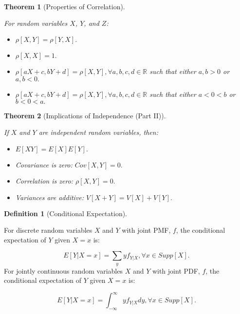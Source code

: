\documentclass[
]{article}
\providecommand{\tightlist}{%
  \setlength{\itemsep}{0pt}\setlength{\parskip}{0pt}}
\newtheorem{theorem}{Theorem}[section]
\theoremstyle{definition}
\newtheorem{definition}{Definition}[section]
\theoremstyle{definition}
\theoremstyle{definition}
\theoremstyle{remark}
\begin{document}
\begin{theorem}[Properties of Correlation]
\protect\hypertarget{thm:unlabeled-div-86}{}\label{thm:unlabeled-div-86}

For random variables \(X\), \(Y\), and \(Z\):

\begin{itemize}
\tightlist
\item
  \(\rho[X,Y] = \rho[Y,X].\)
\item
  \(\rho[X,X] = 1.\)
\item
  \(\rho[aX + c, bY + d] = \rho[X,Y], \forall a,b,c,d \in \mathbb{R}\) such that either \(a,b > 0\) or \(a,b < 0.\)
\item
  \(\rho[aX + c, bY + d] = \rho[X,Y], \forall a,b,c,d \in \mathbb{R}\) such that either \(a < 0 < b\) or \(b < 0 < a.\)
\end{itemize}

\end{theorem}

\begin{theorem}[Implications of Independence (Part II)]
\protect\hypertarget{thm:unlabeled-div-87}{}\label{thm:unlabeled-div-87}

If \(X\) and \(Y\) are independent random variables, then:

\begin{itemize}
\tightlist
\item
  \(E[XY] = E[X]E[Y].\)
\item
  Covariance is zero: \(Cov[X,Y] = 0.\)
\item
  Correlation is zero: \(\rho[X,Y] = 0.\)
\item
  Variances are additive: \(V[X + Y] = V[X] + V[Y].\)
\end{itemize}

\end{theorem}

\begin{definition}[Conditional Expectation]
\protect\hypertarget{def:unlabeled-div-88}{}\label{def:unlabeled-div-88}

For discrete random variables \(X\) and \(Y\) with joint PMF, \(f\), the conditional expectation of \(Y\) given \(X=x\) is:

\[E[Y|X=x] = \sum_y yf_{Y|X}, \forall x \in Supp[X].\]
For jointly continuous random variables \(X\) and \(Y\) with joint PDF, \(f\), the conditional expectation of \(Y\) given \(X=x\) is:

\[E[Y|X=x] = \int_{-\infty}^{\infty}yf_{Y|X}dy, \forall x \in Supp[X].\]

\end{definition}
\end{document}
